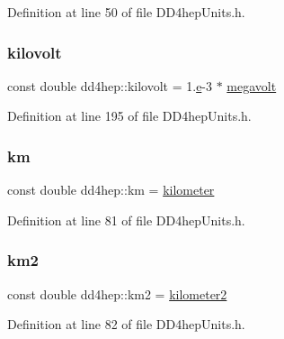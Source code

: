 Definition at line 50 of file D\+D4hep\+Units.\+h.

\hypertarget{namespacedd4hep_a40753aea7e38ef27423508645ac40b19}{}\label{namespacedd4hep_a40753aea7e38ef27423508645ac40b19} 
\subsubsection{\texorpdfstring{kilovolt}{kilovolt}}
{\footnotesize\ttfamily const double dd4hep\+::kilovolt = 1.\hyperlink{_volumes_8cpp_a8a9a1f93e9b09afccaec215310e64142}{e}-\/3 $\ast$ \hyperlink{namespacedd4hep_a0899b6d1861ddc5f615d06209fb6a9fe}{megavolt}\hspace{0.3cm}{\ttfamily [static]}}



Definition at line 195 of file D\+D4hep\+Units.\+h.

\hypertarget{namespacedd4hep_ab6ce99bfb21ce99b93b69efc2f5ad7a4}{}\label{namespacedd4hep_ab6ce99bfb21ce99b93b69efc2f5ad7a4} 
\subsubsection{\texorpdfstring{km}{km}}
{\footnotesize\ttfamily const double dd4hep\+::km = \hyperlink{namespacedd4hep_a689bd0289c6c83e392d385bc870a34ab}{kilometer}\hspace{0.3cm}{\ttfamily [static]}}



Definition at line 81 of file D\+D4hep\+Units.\+h.

\hypertarget{namespacedd4hep_a94b468639aec795c528305ad9ba0245e}{}\label{namespacedd4hep_a94b468639aec795c528305ad9ba0245e} 
\subsubsection{\texorpdfstring{km2}{km2}}
{\footnotesize\ttfamily const double dd4hep\+::km2 = \hyperlink{namespacedd4hep_a61bb5393f7b8ec3694cb8e522145695f}{kilometer2}\hspace{0.3cm}{\ttfamily [static]}}



Definition at line 82 of file D\+D4hep\+Units.\+h.

\hypertarget{namespacedd4hep_a4f0627a7e7338d69e3d58675ddbd95f6}{}\label{namespacedd4hep_a4f0627a7e7338d69e3d58675ddbd95f6} 
